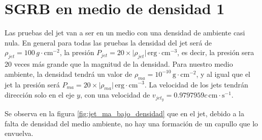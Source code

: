 \documentclass[12pt,a4paper]{book}
\begin{document}


\section{SGRB en medio de densidad 1}


Las pruebas del jet van a ser en un medio con una densidad de ambiente casi nula. En general para todas las pruebas la densidad del jet será de $\rho_{jet}  = 100 \, g \cdot \mathrm{cm}^{-2}$, la presión $P_{jet} = 20 \times  \lvert \rho_{jet} \rvert \, \mathrm{erg} \cdot \mathrm{cm}^{-3}$, es decir, la presión sera 20 veces más grande que la magnitud de la densidad. Para nuestro medio ambiente, la densidad tendrá un valor de $\rho_{ma}  = 10^{-10} \, \mathrm{g} \cdot \mathrm{cm}^{-2}$, y al igual que el jet la presión será $P_{ma} = 20 \times \lvert \rho_{ma} \rvert \, \mathrm{erg} \cdot \mathrm{cm}^{-3}$. La velocidad de los jets tendrán dirección solo en el eje $y$, con una velocidad de $v_{jet_{y}} = 0.9797959c \, \mathrm{cm} \cdot \mathrm{s}^{-1}$.

Se observa en la figura \ref{fig:jet_ma_bajo_densidad} que en el jet, debido a la falta de densidad del medio ambiente, no hay una formación de un capullo que lo envuelva.


\end{document}
